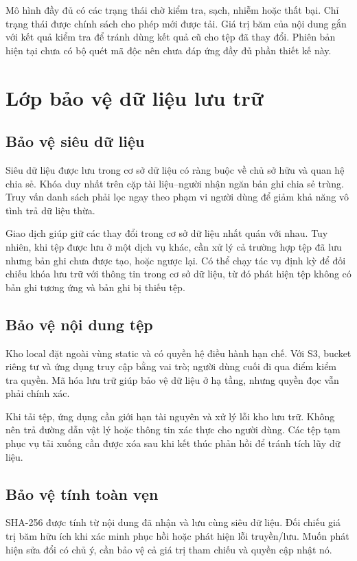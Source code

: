 Mô hình đầy đủ có các trạng thái chờ kiểm tra, sạch, nhiễm hoặc thất bại. Chỉ trạng thái được chính sách cho phép mới được tải. Giá trị băm của nội dung gắn với kết quả kiểm tra để tránh dùng kết quả cũ cho tệp đã thay đổi. Phiên bản hiện tại chưa có bộ quét mã độc nên chưa đáp ứng đầy đủ phần thiết kế này.

\section{Lớp bảo vệ dữ liệu lưu trữ}
\subsection{Bảo vệ siêu dữ liệu}
Siêu dữ liệu được lưu trong cơ sở dữ liệu có ràng buộc về chủ sở hữu và quan hệ chia sẻ. Khóa duy nhất trên cặp tài liệu--người nhận ngăn bản ghi chia sẻ trùng. Truy vấn danh sách phải lọc ngay theo phạm vi người dùng để giảm khả năng vô tình trả dữ liệu thừa.

Giao dịch giúp giữ các thay đổi trong cơ sở dữ liệu nhất quán với nhau. Tuy nhiên, khi tệp được lưu ở một dịch vụ khác, cần xử lý cả trường hợp tệp đã lưu nhưng bản ghi chưa được tạo, hoặc ngược lại. Có thể chạy tác vụ định kỳ để đối chiếu khóa lưu trữ với thông tin trong cơ sở dữ liệu, từ đó phát hiện tệp không có bản ghi tương ứng và bản ghi bị thiếu tệp.
\subsection{Bảo vệ nội dung tệp}
Kho local đặt ngoài vùng static và có quyền hệ điều hành hạn chế. Với S3, bucket riêng tư và ứng dụng truy cập bằng vai trò; người dùng cuối đi qua điểm kiểm tra quyền. Mã hóa lưu trữ giúp bảo vệ dữ liệu ở hạ tầng, nhưng quyền đọc vẫn phải chính xác.

Khi tải tệp, ứng dụng cần giới hạn tài nguyên và xử lý lỗi kho lưu trữ. Không nên trả đường dẫn vật lý hoặc thông tin xác thực cho người dùng. Các tệp tạm phục vụ tải xuống cần được xóa sau khi kết thúc phản hồi để tránh tích lũy dữ liệu.
\subsection{Bảo vệ tính toàn vẹn}
SHA-256 được tính từ nội dung đã nhận và lưu cùng siêu dữ liệu. Đối chiếu giá trị băm hữu ích khi xác minh phục hồi hoặc phát hiện lỗi truyền/lưu. Muốn phát hiện sửa đổi có chủ ý, cần bảo vệ cả giá trị tham chiếu và quyền cập nhật nó.

